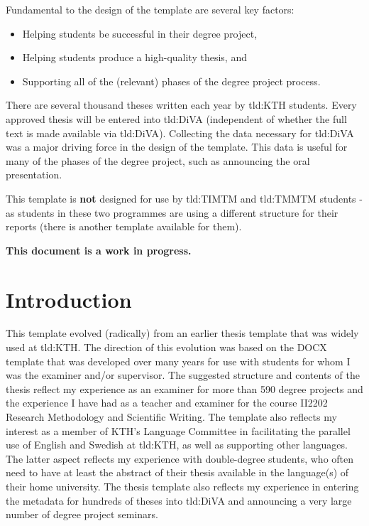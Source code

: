 Fundamental to the design of the template are several key factors:
\begin{itemize}
    \item Helping students be successful in their degree project,
    \item Helping students produce a high-quality thesis, and
    \item Supporting all of the (relevant) phases of the degree project process.
\end{itemize}

There are several thousand theses written each year by \gls{tld:KTH} students. Every approved thesis will be entered into \gls{tld:DiVA} (independent of whether the full text is made available via \gls{tld:DiVA}). Collecting the data necessary for \gls{tld:DiVA} was a major driving force in the design of the template. This data is useful for many of the phases of the degree project, such as announcing the oral presentation.
    
This template is \textbf{not} designed for use by \gls{tld:TIMTM} and \gls{tld:TMMTM} students - as students in these two programmes are using a different structure for their reports (there is another template available for them).

\textbf{This document is a work in progress.}

\section{Introduction}
This template evolved (radically) from an earlier thesis template that was widely used at \gls{tld:KTH}. The direction of this evolution was based on the DOCX template that was developed over many years for use with students for whom I was the examiner and/or supervisor. The suggested structure and contents of the thesis reflect my experience as an examiner for more than 590 degree projects and the experience I have had as a teacher and examiner for the course II2202 Research Methodology and Scientific Writing. The template also reflects my interest as a member of KTH's Language Committee in facilitating the parallel use of English and Swedish at \gls{tld:KTH}, as well as supporting other languages. The latter aspect
reflects my experience with double-degree students, who often need to have at least the abstract of their thesis available in the language(s) of their home university. The thesis template also reflects
my experience in entering the metadata for hundreds of theses into \gls{tld:DiVA} and announcing a very large number of degree project seminars.

